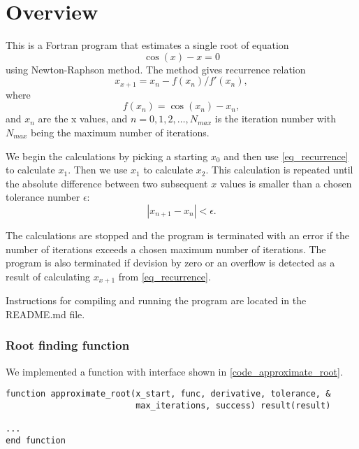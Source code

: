 \part{Overview}

This is a Fortran program that estimates a single root of equation
\begin{equation}
  \cos(x) - x = 0
  \label{eq_root}
\end{equation}
using Newton-Raphson method. The method gives recurrence relation
\begin{equation}
  x_{x+1} = x_n - f(x_n) / f'(x_n),
  \label{eq_recurrence}
\end{equation}
where
\[
  f(x_n) = \cos(x_n) - x_n,
\]
and $x_n$ are the x values, and $n = 0, 1, 2, \dots, N_{max}$ is the iteration number with $N_{max}$ being the maximum number of iterations.

We begin the calculations by picking a starting $x_0$ and then use \autoref{eq_recurrence} to calculate $x_1$. Then we use $x_1$ to calculate $x_2$. This calculation is repeated until the absolute difference between two subsequent $x$ values is smaller than a chosen tolerance number $\epsilon$:
\[
  |{x_{n+1} - x_n}| < \epsilon.
\]

The calculations are stopped and the program is terminated with an error if the number of iterations exceeds a chosen maximum number of iterations. The program is also terminated if devision by zero or an overflow is detected as a result of calculating $x_{x+1}$ from \autoref{eq_recurrence}.

Instructions for compiling and running the program are located in the README.md file.


\section{Root finding function}

We implemented a function  with interface shown in \autoref{code_approximate_root}.

\noindent\begin{minipage}{\linewidth}
\begin{lstlisting}[caption={Definition of a function for approximating a root of equation that is passed as input parameter (\code{newton\_raphson.f90}).},frame=tlrb,label={code_approximate_root}]
function approximate_root(x_start, func, derivative, tolerance, &
                          max_iterations, success) result(result)

...
end function
\end{lstlisting}
\end{minipage}

